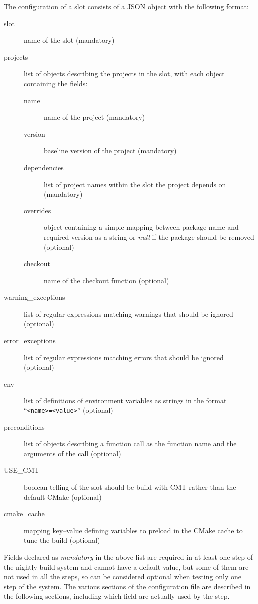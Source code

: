 \documentclass{lhcbnote}
\begin{document}
The configuration of a slot consists of a JSON object with the following format:
\begin{description}
  \item[slot] name of the slot (mandatory)
  \item[projects] list of objects describing the projects in the slot, with each
  object containing the fields:
  \begin{description}
    \item[name] name of the project (mandatory)
    \item[version] baseline version of the project (mandatory)
    \item[dependencies] list of project names within the slot the project
    depends on (mandatory)
    \item[overrides] object containing a simple mapping between package name and
    required version as a string or \emph{null} if the package should be removed
    (optional)
    \item[checkout] name of the checkout function (optional)
  \end{description}
  \item[warning\_exceptions] list of regular expressions matching warnings that
  should be ignored (optional)
  \item[error\_exceptions] list of regular expressions matching errors that
  should be ignored (optional)
  \item[env] list of definitions of environment variables as strings in the
  format ``\texttt{<name>=<value>}'' (optional)
  \item[preconditions] list of objects describing a function call as the
  function name and the arguments of the call (optional)
  \item[USE\_CMT] boolean telling of the slot should be build with CMT rather
  than the default CMake (optional)
  \item[cmake\_cache] mapping key--value defining variables to preload in the
  CMake cache to tune the build (optional)
\end{description}
Fields declared as \emph{mandatory} in the above list are required in at least
one step of the nightly build system and cannot have a default value, but some
of them are not used in all the steps, so can be considered optional when
testing only one step of the system.  The various sections of the configuration
file are described in the following sections, including which field are actually
used by the step.
\end{document}
